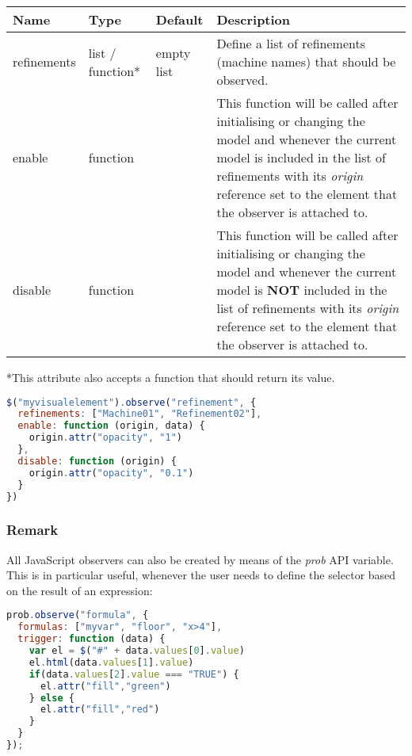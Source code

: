 \begin{tabular}{ l l l p{7cm} }
  \textbf{Name} & \textbf{Type} & \textbf{Default} & \textbf{Description} \\
  \hline\noalign{\medskip}
  refinements & list / function* & empty list & Define a list of refinements (machine names) that should be observed.\\
  \hline\noalign{\medskip}
  enable & function &  & This function will be called after initialising or changing the model and whenever the current model is included in the list of refinements with its \textit{origin} reference set to the element that the observer is attached to.\\
  \hline\noalign{\medskip}
  disable & function &  & This function will be called after initialising or changing the model and whenever the current model is \textbf{NOT} included in the list of refinements with its \textit{origin} reference set to the element that the observer is attached to.\\
\end{tabular}

*This attribute also accepts a function that should return its value.

\begin{lstlisting}[language=JavaScript]
$("myvisualelement").observe("refinement", {
  refinements: ["Machine01", "Refinement02"],
  enable: function (origin, data) {
    origin.attr("opacity", "1")
  },
  disable: function (origin) {
    origin.attr("opacity", "0.1")
  }
})
\end{lstlisting}

\subsubsection{Remark}

All JavaScript observers can also be created by means of the \textit{prob} API variable. 
This is in particular useful, whenever the user needs to define the selector based on the result of an expression:

\begin{lstlisting}[language=JavaScript]
prob.observe("formula", {
  formulas: ["myvar", "floor", "x>4"],
  trigger: function (data) {
    var el = $("#" + data.values[0].value)
    el.html(data.values[1].value)
    if(data.values[2].value === "TRUE") {
      el.attr("fill","green")
    } else {
      el.attr("fill","red")
    }
  }
});
\end{lstlisting}

